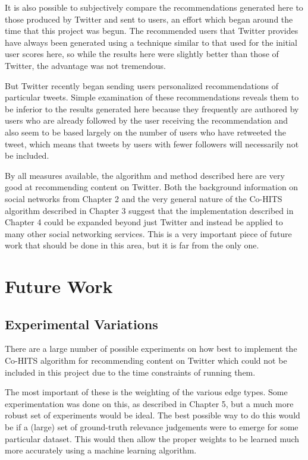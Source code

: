It is also possible to subjectively compare the recommendations generated here to those produced by Twitter and sent to users, an effort which began around the time that this project was begun. The recommended users that Twitter provides have always been generated using a technique similar to that used for the initial user scores here, so while the results here were slightly better than those of Twitter, the advantage was not tremendous.

But Twitter recently began sending users personalized recommendations of particular tweets. Simple examination of these recommendations reveals them to be inferior to the results generated here because they frequently are authored by users who are already followed by the user receiving the recommendation and also seem to be based largely on the number of users who have retweeted the tweet, which means that tweets by users with fewer followers will necessarily not be included.

By all measures available, the algorithm and method described here are very good at recommending content on Twitter. Both the background information on social networks from Chapter 2 and the very general nature of the Co-HITS algorithm described in Chapter 3 suggest that the implementation described in Chapter 4 could be expanded beyond just Twitter and instead be applied to many other social networking services. This is a very important piece of future work that should be done in this area, but it is far from the only one.


\section{Future Work}

\subsection{Experimental Variations}

There are a large number of possible experiments on how best to implement the Co-HITS algorithm for recommending content on Twitter which could not be included in this project due to the time constraints of running them.

The most important of these is the weighting of the various edge types. Some experimentation was done on this, as described in Chapter 5, but a much more robust set of experiments would be ideal. The best possible way to do this would be if a (large) set of ground-truth relevance judgements were to emerge for some particular dataset. This would then allow the proper weights to be learned much more accurately using a machine learning algorithm.

